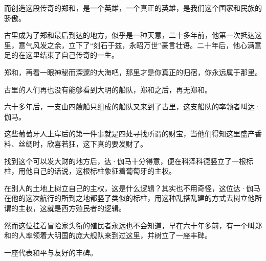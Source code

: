 \begin{multicols}{\theparacolNo}
而创造这段传奇的郑和，是一个英雄，一个真正的英雄，是我们这个国家和民族的骄傲。

古里成为了郑和最后到达的地方，似乎是一种天意，二十多年前，他第一次抵达这里，意气风发之余，立下了“刻石于兹，永昭万世”豪言壮语。二十年后，他心满意足的在这里结束了自己传奇的一生。

郑和，再看一眼神秘而深邃的大海吧，那里才是你真正的归宿，你永远属于那里。

古里的人们再也没有能够看到大明的船队，郑和之后，再无郑和。

六十多年后，一支由四艘船只组成的船队又来到了古里，这支船队的率领者叫达·伽马。

这些葡萄牙人上岸后的第一件事就是四处寻找所谓的财宝，当他们得知这里盛产香料、丝绸时，欣喜若狂，这下真的要发财了。

找到这个可以发大财的地方后，达·伽马十分得意，便在科泽科德竖立了一根标柱，用他自己的话说，这根标柱象征着葡萄牙的主权。

在别人的土地上树立自己的主权，这是什么逻辑？其实也不用奇怪，这位达·伽马在他的这次航行的所到之地都竖了类似的标柱，用这种乱搭乱建的方式去树立他所谓的主权，这就是西方殖民者的逻辑。

然而这位挂着冒险家头衔的殖民者永远也不会知道，早在六十年多前，有一个叫郑和的人率领着大明国的庞大舰队来到过这里，并树立了一座丰碑。

一座代表和平与友好的丰碑。
\ifnum{}
	\end{multicols}
\fi
\newpage
